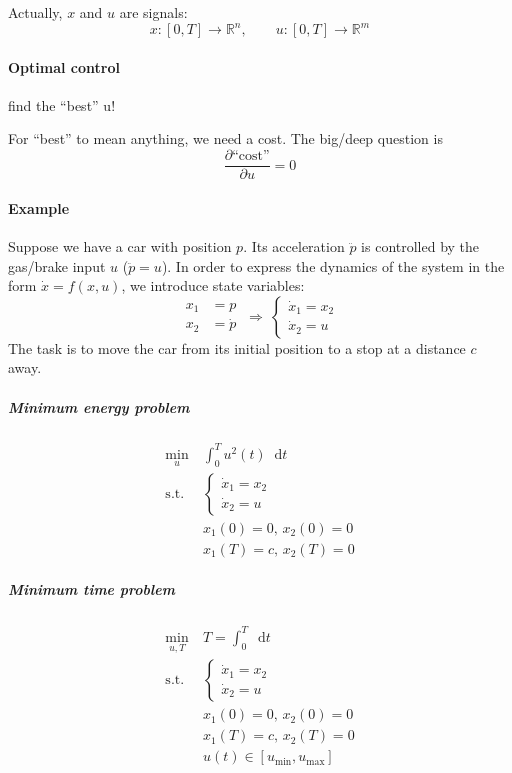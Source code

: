 \documentclass[letterpaper,12pt,titlepage]{report}
\newcommand*\dif{\mathop{}\!\mathrm{d}}
\theoremstyle{plain}
\theoremstyle{definition}
\begin{document}
Actually, $x$ and $u$ are signals:
\[ x:[0,T]\to\mathbb{R}^n, \qquad u:[0,T]\to\mathbb{R}^m \]

\paragraph{Optimal control} find the ``best'' u!

For ``best'' to mean anything, we need a cost. The big/deep question is
\[ \frac{\partial \text{``cost''}}{\partial u} = 0 \]

\paragraph{Example} \mbox{}

Suppose we have a car with position $p$. Its acceleration $\ddot{p}$ is controlled by the gas/brake input $u$ ($\ddot{p}=u$). In order to express the dynamics of the system in the form $\dot{x}=f(x,u)$, we introduce state variables:
\[
  \begin{aligned} x_1 &= p \\ x_2 &= \dot{p} \end{aligned}
  \ \Longrightarrow \
  \begin{cases} \dot{x}_1 = x_2 \\ \dot{x}_2 = u \end{cases}
\]
The task is to move the car from its initial position to a stop at a distance $c$ away.

\subparagraph{Minimum energy problem}
\begin{align}
  \min_u {}\ & \int_0^T\! u^2(t) \dif t \\
  \text{s.t. } & \begin{cases} \dot{x}_1 = x_2 \\ \dot{x}_2 = u \end{cases} \\
             & x_1(0) = 0,\, x_2(0) = 0 \\
             & x_1(T) = c,\, x_2(T) = 0
\end{align}

\subparagraph{Minimum time problem}
\begin{align}
  \min_{u,T} {}\ & T = \int_0^T\! \dif t \\
  \text{s.t. } & \begin{cases} \dot{x}_1 = x_2 \\ \dot{x}_2 = u \end{cases} \\
                 & x_1(0) = 0,\, x_2(0) = 0 \\
                 & x_1(T) = c,\, x_2(T) = 0 \\
                 & u(t) \in [u_\text{min},u_\text{max}]
\end{align}
\end{document}
